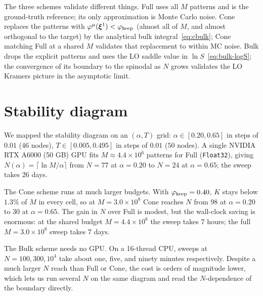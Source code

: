 \documentclass[letterpaper]{article} %
\newcommand{\bxi}{\boldsymbol{\xi}}
\newcommand{\Bnet}{\beta}
\begin{document}
The three schemes validate different things. Full uses all $M$ patterns and is the ground-truth reference; its only approximation is Monte Carlo noise. Cone replaces the patterns with $\varphi^\mu(\bxi^1) < \varphi_{\rm keep}$ (almost all of $M$, and almost orthogonal to the target) by the analytical bulk integral~\eqref{eq:cbulk}; Cone matching Full at a shared $M$ validates that replacement to within MC noise. Bulk drops the explicit patterns and uses the LO saddle value in $\ln S$~\eqref{eq:bulk-logS}; the convergence of its boundary to the spinodal as $N$ grows validates the LO Kramers picture in the asymptotic limit.



\section{Stability diagram}
\label{sec:results}

We mapped the stability diagram %
on an $(\alpha, T)$ grid: $\alpha \in [0.20, 0.65]$ in steps of $0.01$ ($46$ nodes), $T \in [0.005, 0.495]$ in steps of $0.01$ ($50$ nodes). A single NVIDIA RTX A6000 (50 GB) GPU fits $M \approx 4.4 \times 10^6$ patterns for Full (\texttt{Float32}), giving $N(\alpha) = \lceil \ln M / \alpha \rceil$ from $N = 77$ at $\alpha = 0.20$ to $N = 24$ at $\alpha = 0.65$; the sweep takes $26$ days.

The Cone scheme runs at much larger budgets. With $\varphi_{\rm keep} = 0.40$, $K$ stays below $1.3\%$ of $M$ in every cell, so at $M = 3.0 \times 10^8$ Cone reaches $N$ from $98$ at $\alpha = 0.20$ to $30$ at $\alpha = 0.65$. The gain in $N$ over Full is modest, but the wall-clock saving is enormous: at the shared budget $M = 4.4 \times 10^6$ the sweep takes $7$ hours; the full $M = 3.0 \times 10^8$ sweep takes $7$ days.

The Bulk scheme needs no GPU. On a 16-thread CPU, sweeps at $N = 100, 300, 10^4$ take about one, five, and ninety minutes respectively. Despite a much larger $N$ reach than Full or Cone, the cost is orders of magnitude lower, which lets us run several $N$ on the same diagram and read the $N$-dependence of the boundary directly. 

\end{document}
